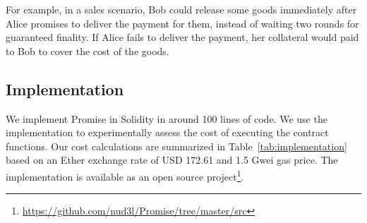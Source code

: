 \documentclass[runningheads]{llncs}
\newcommand{\sys}{Promise\xspace}
\begin{document}
For example, in a sales scenario, Bob could release some goods immediately after Alice promises to deliver the payment for them, instead of waiting two rounds for guaranteed finality. If Alice fails to deliver the payment, her collateral would paid to Bob to cover the cost of the goods.






\subsection{Implementation}

We implement \sys in Solidity in around 100 lines of code.
We use the implementation to experimentally assess the cost of executing the contract functions.
Our cost calculations are summarized in Table~\ref{tab:implementation} based on an Ether exchange rate of USD 172.61 and 1.5 Gwei gas price.
The implementation is available as an open source project\footnote{\url{https://github.com/nud3l/Promise/tree/master/src}}.
\end{document}
